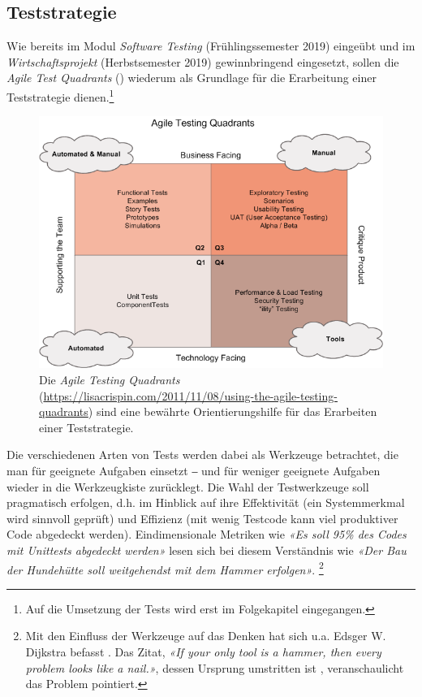 \clearpage

\subsection{Teststrategie}
\label{sec:teststrategie}

Wie bereits im Modul \textit{Software Testing} (Frühlingssemester 2019) eingeübt und im \textit{Wirtschaftsprojekt} (Herbstsemester 2019) gewinnbringend eingesetzt, sollen die \textit{Agile Test Quadrants} () wiederum als Grundlage für die Erarbeitung einer Teststrategie dienen.\footnote{Auf die Umsetzung der Tests wird erst im Folgekapitel  eingegangen.}

\begin{figure}[tbh]
    \centering
    \includegraphics[width=\linewidth]{pics/agile-testing-quadrants.png}
    \caption{Die \textit{Agile Testing Quadrants} (\url{https://lisacrispin.com/2011/11/08/using-the-agile-testing-quadrants}) sind eine bewährte Orientierungshilfe für das Erarbeiten einer Teststrategie.}
    \label{fig:agile-testing-quadrants}
\end{figure}

Die verschiedenen Arten von Tests werden dabei als Werkzeuge betrachtet, die man für geeignete Aufgaben einsetzt ‒ und für weniger geeignete Aufgaben wieder in die Werkzeugkiste zurücklegt. Die Wahl der Testwerkzeuge soll pragmatisch erfolgen, d.h. im Hinblick auf ihre Effektivität (ein Systemmerkmal wird sinnvoll geprüft) und Effizienz (mit wenig Testcode kann viel produktiver Code abgedeckt werden). Eindimensionale Metriken wie \textit{«Es soll 95\% des Codes mit Unittests abgedeckt werden»} lesen sich bei diesem Verständnis wie \textit{«Der Bau der Hundehütte soll weitgehendst mit dem Hammer erfolgen»}. \footnote{Mit den Einfluss der Werkzeuge auf das Denken hat sich u.a. Edsger W. Dijkstra befasst \cite{dijkstra-council}. Das Zitat, \textit{«If your only tool is a hammer, then every problem looks like a nail.»}, dessen Ursprung umstritten ist \cite{quoteinvestigator}, veranschaulicht das Problem pointiert.} 

